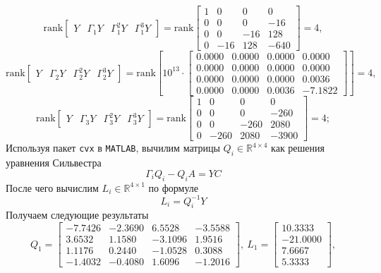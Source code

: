 \documentclass[a4paper, 12pt]{article}
\begin{document}
    $$
    \text{rank}\begin{bmatrix}Y &\Gamma_1Y &\Gamma_1^2Y &\Gamma_1^3Y\end{bmatrix}=\text{rank}\begin{bmatrix}
    1     &0     &0     &0\\
    0     &0     &0   &-16\\
    0     &0   &-16   &128\\
    0   &-16   &128  &-640
    \end{bmatrix}=4,
    $$
    $$
    \text{rank}\begin{bmatrix}Y &\Gamma_2Y &\Gamma_2^2Y &\Gamma_2^3Y\end{bmatrix}=\text{rank}\left[10^{13}\cdot\begin{bmatrix}
        0.0000         &0.0000         &0.0000         &0.0000\\
        0.0000         &0.0000         &0.0000   &0.0000\\
        0.0000         &0.0000   &0.0000    &0.0036\\
        0.0000   &0.0000    &0.0036   &-7.1822
    \end{bmatrix}\right]=4,
    $$
    $$
    \text{rank}\begin{bmatrix}Y &\Gamma_3Y &\Gamma_3^2Y &\Gamma_3^3Y\end{bmatrix}=\text{rank}\begin{bmatrix}
        1           &0           &0           &0\\
        0           &0           &0        &-260\\
        0           &0        &-260        &2080\\
        0        &-260        &2080       &-3900
    \end{bmatrix}=4;
    $$
    Используя пакет \texttt{cvx} в \texttt{MATLAB}, вычилим матрицы $Q_i\in\mathbb{R}^{4\times4}$ как решения уравнения Сильвестра
    $$
    \Gamma_iQ_i-Q_iA=YC
    $$
    После чего вычислим $L_i\in\mathbb{R}^{4\times1}$ по формуле
    $$
    L_i=Q_i^{-1}Y
    $$
    Получаем следующие результаты
    $$
    Q_1=\begin{bmatrix}
    -7.7426   &-2.3690    &6.5528   &-3.5588\\
    3.6532    &1.1580   &-3.1096    &1.9516\\
    1.1176    &0.2440   &-1.0528    &0.3088\\
   -1.4032   &-0.4080    &1.6096   &-1.2016
    \end{bmatrix},\ L_1=\begin{bmatrix}
    10.3333\\
  -21.0000\\
    7.6667\\
    5.3333
    \end{bmatrix},
    $$
\end{document}

